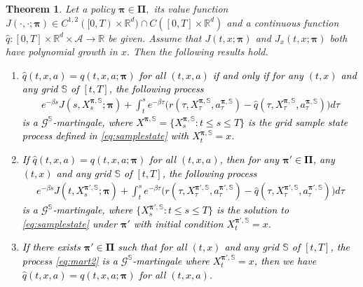 \documentclass[11pt]{article}
\newtheorem{theorem}{Theorem}
\newcommand{\1}{\mathbbm{1}}
\newcommand{\bpi}{\boldsymbol{\pi}}
\newcommand{\rev}[1]{\textcolor{black}{{#1}}} %
\begin{document}
\begin{theorem}\label{thm:mart1}
Let a policy $\boldsymbol{\pi} \in \boldsymbol{\Pi},$ its value function $J(\cdot, \cdot; \boldsymbol{\pi}) \in C^{1,2}([0,T)\times\mathbb{R}^d)\cap C([0,T]\times\mathbb{R}^d)$ and a continuous function $\hat q: [0, T] \times \mathbb{R}^d \times \mathcal{A} \rightarrow \mathbb{R}$ be given. Assume that $J(t,x;\bpi)$ and $J_x(t,x;\bpi)$ both have polynomial growth in $x$. Then the following results hold.
\begin{enumerate}
	
\item [(i)] \rev{$\hat q(t,x, a) = q(t,x, a; \boldsymbol{\pi}) $ for all $(t,x,a)$ if and only if for any $(t,x)$ and any grid $\mathbb{S}$ of $[t,T]$, the following process
	\begin{align} \label{eq:mart1}
		e^{-\beta s}  J(s, X_s^{ \boldsymbol{\pi, \mathbb{S}}}; \boldsymbol{\pi}) +    \int_t^s e^{-\beta \tau } \big( r( \tau, X_{\tau}^{\boldsymbol{\pi}, \mathbb{S}}, a_{\tau}^{\boldsymbol{\pi},  \mathbb{S}}) - \hat q ( \tau, X_{\tau}^{\boldsymbol{\pi, \mathbb{S}}}, a_{\tau}^{\boldsymbol{\pi, \mathbb{S}}})\big) d\tau
	\end{align}
	is a $\mathcal{G}^{\mathbb{S}}$-martingale, where  $X^{\boldsymbol{\pi, \mathbb{S} }} = \{X^{\boldsymbol{\pi, \mathbb{S}}}_s: t \le s \le T\}$ is the grid sample state process defined in \eqref{eq:samplestate} with $X^{\boldsymbol{\pi}, \mathbb{S}}_t =x$.}

	\item [(ii)] \rev{If $\hat q(t,x, a) = q(t,x, a; \boldsymbol{\pi}) $ for all $(t,x,a)$, then for any $\boldsymbol{\pi}' \in \boldsymbol{\Pi}$, any $(t,x)$ and any grid $\mathbb{S}$ of $[t,T]$,  the following process
	\begin{align} \label{eq:mart2}
		e^{-\beta s}  J(t, X_s^{ \boldsymbol{\pi}', \mathbb{S}}; \boldsymbol{\pi}) +    \int_t^s e^{-\beta\tau}\big(r( \tau, X_{\tau}^{\boldsymbol{\pi}', \mathbb{S}}, a_{\tau}^{\boldsymbol{\pi}', \mathbb{S}}) - \hat q(\tau, X_{\tau}^{\boldsymbol{\pi}', \mathbb{S}}, a_{\tau}^{\boldsymbol{\pi}', \mathbb{S}})\big) d\tau
	\end{align}
	is a $\mathcal{G}^{\mathbb{S}}$-martingale, where  $ \{X^{\boldsymbol{\pi}', \mathbb{S}}_s: t \le s \le T\}$ is the solution to  \eqref{eq:samplestate} under $\boldsymbol{\pi}'$ with initial condition $X^{\boldsymbol{\pi}', \mathbb{S}}_t =x$.}
	
	
	\item [(iii)] \rev{If there exists $\boldsymbol{\pi}' \in \boldsymbol{\Pi}$ such that for all $(t,x)$ and any grid $\mathbb{S}$ of $[t,T]$, the process \eqref{eq:mart2} is a $\mathcal{G}^{\mathbb{S}}$-martingale where $X^{\boldsymbol{\pi}', \mathbb{S}}_t =x$, then we have $\hat q(t,x, a) = q(t,x, a; \boldsymbol{\pi}) $ for all $(t,x,a)$. }
	

\end{enumerate}
\end{theorem}
\end{document}
